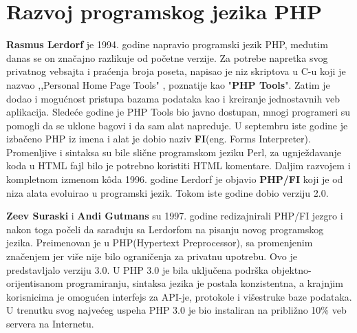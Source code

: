 \documentclass[a4paper]{article}
\begin{document}
{%



\section{Razvoj programskog jezika PHP}
\textbf{Rasmus Lerdorf} je 1994. godine napravio programski jezik PHP\cite{php}, međutim danas se on značajno razlikuje od početne verzije. Za potrebe napretka svog privatnog vebsajta i praćenja broja poseta, napisao je niz skriptova u C-u koji je nazvao ,,Personal Home Page Tools" , poznatije kao "\textbf{PHP Tools}". Zatim je dodao i mogućnost pristupa bazama podataka kao i kreiranje jednostavnih veb aplikacija. Sledeće godine je PHP Tools bio javno dostupan, mnogi programeri su pomogli da se uklone bagovi i da sam alat napreduje. U septembru iste godine je izbačeno PHP iz imena i alat je dobio naziv \textbf{FI}(eng. Forms Interpreter). Promenljive i sintaksa su bile slične programskom jeziku Perl, za ugnježdavanje koda u HTML fajl bilo je potrebno koristiti HTML komentare. Daljim razvojem i kompletnom izmenom k\^{o}da 1996. godine Lerdorf je objavio \textbf{PHP/FI} \cite{phpfi} koji je od niza alata evoluirao u programski jezik. Tokom iste godine dobio verziju 2.0.

\textbf{Zeev Suraski} i \textbf{Andi Gutmans} su 1997. godine redizajnirali PHP/FI jezgro i nakon toga počeli da sarađuju sa Lerdorfom na pisanju novog programskog jezika. Preimenovan je u PHP(Hypertext Preprocessor), sa promenjenim značenjem jer više nije bilo ograničenja za privatnu upotrebu. Ovo je predstavljalo verziju 3.0. U PHP 3.0 je bila uključena podrška objektno-orijentisanom programiranju, sintaksa jezika je postala konzistentna, a krajnjim korisnicima je omogućen interfejs za API-je, protokole i višestruke baze podataka. U trenutku svog najvećeg uspeha PHP 3.0 je bio instaliran na približno 10\% veb servera na Internetu\cite{php}.


}
\end{document}
